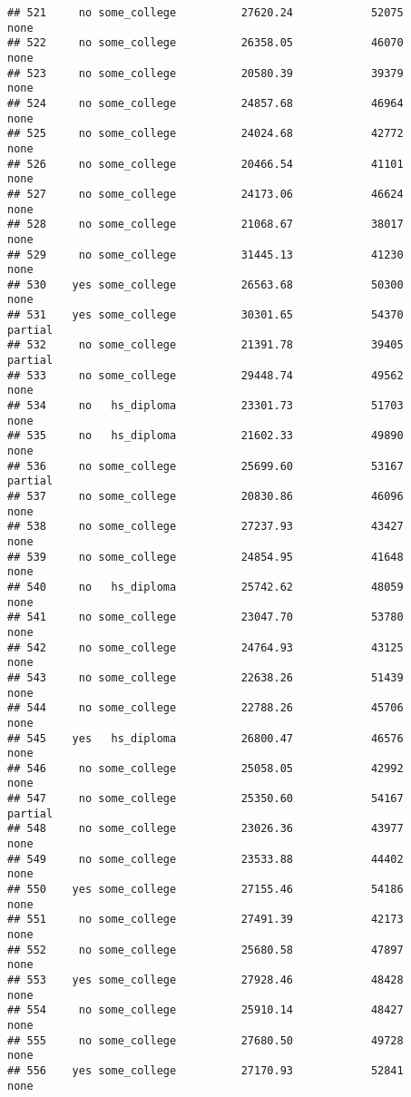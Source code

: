 \documentclass[
]{article}
\begin{document}
\begin{verbatim}
## 521     no some_college          27620.24            52075        none
## 522     no some_college          26358.05            46070        none
## 523     no some_college          20580.39            39379        none
## 524     no some_college          24857.68            46964        none
## 525     no some_college          24024.68            42772        none
## 526     no some_college          20466.54            41101        none
## 527     no some_college          24173.06            46624        none
## 528     no some_college          21068.67            38017        none
## 529     no some_college          31445.13            41230        none
## 530    yes some_college          26563.68            50300        none
## 531    yes some_college          30301.65            54370     partial
## 532     no some_college          21391.78            39405     partial
## 533     no some_college          29448.74            49562        none
## 534     no   hs_diploma          23301.73            51703        none
## 535     no   hs_diploma          21602.33            49890        none
## 536     no some_college          25699.60            53167     partial
## 537     no some_college          20830.86            46096        none
## 538     no some_college          27237.93            43427        none
## 539     no some_college          24854.95            41648        none
## 540     no   hs_diploma          25742.62            48059        none
## 541     no some_college          23047.70            53780        none
## 542     no some_college          24764.93            43125        none
## 543     no some_college          22638.26            51439        none
## 544     no some_college          22788.26            45706        none
## 545    yes   hs_diploma          26800.47            46576        none
## 546     no some_college          25058.05            42992        none
## 547     no some_college          25350.60            54167     partial
## 548     no some_college          23026.36            43977        none
## 549     no some_college          23533.88            44402        none
## 550    yes some_college          27155.46            54186        none
## 551     no some_college          27491.39            42173        none
## 552     no some_college          25680.58            47897        none
## 553    yes some_college          27928.46            48428        none
## 554     no some_college          25910.14            48427        none
## 555     no some_college          27680.50            49728        none
## 556    yes some_college          27170.93            52841        none

\end{verbatim}
\end{document}
